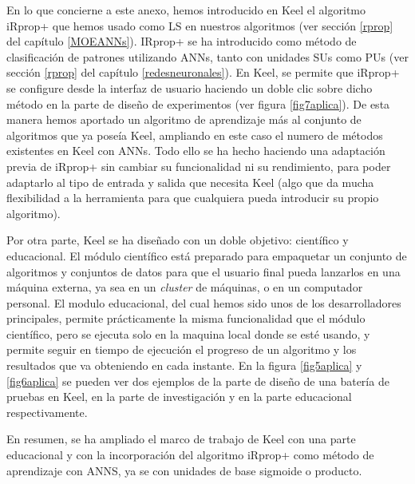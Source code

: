 En lo que concierne a este anexo, hemos introducido en Keel el algoritmo iRprop+ que
 hemos usado como LS en nuestros algoritmos (ver sección
 \ref{rprop} del capítulo \ref{MOEANNs}). IRprop+ se ha introducido como método de clasificación de
 patrones utilizando ANNs, tanto con unidades SUs como PUs (ver sección
\ref{rprop} del  capítulo \ref{redesneuronales}). En Keel, se permite que iRprop+ se configure desde
la interfaz de
 usuario haciendo un doble clic sobre dicho método en la parte de diseño de experimentos (ver figura
 \ref{fig7aplica}). De esta manera hemos aportado un algoritmo de aprendizaje más al conjunto de
 algoritmos que ya poseía Keel, ampliando en este caso el numero de métodos existentes en Keel con
 ANNs. Todo ello se ha hecho haciendo una adaptación previa de iRprop+ sin cambiar su funcionalidad
 ni su rendimiento, para poder adaptarlo al tipo de entrada y salida que necesita Keel (algo que da
 mucha flexibilidad a la herramienta para que cualquiera pueda introducir su propio algoritmo).

Por otra parte, Keel se ha diseñado con un doble objetivo: científico y educacional. El
módulo científico está preparado para empaquetar un conjunto de algoritmos y conjuntos de datos
para que el usuario final pueda lanzarlos en una máquina externa, ya sea en un \textit{cluster} de
máquinas, o en un computador personal. El modulo educacional, del cual hemos sido unos de los
desarrolladores principales, permite prácticamente la misma funcionalidad que el módulo científico,
pero se ejecuta solo en la maquina local donde se esté usando, y permite seguir en tiempo de
ejecución el progreso de un algoritmo y los resultados que va obteniendo en cada instante. En la
figura \ref{fig5aplica} y \ref{fig6aplica} se pueden ver dos ejemplos de la parte de diseño de una
batería de pruebas en Keel, en la parte de investigación y en la parte educacional respectivamente.

En resumen, se ha ampliado el marco de trabajo de Keel con una parte educacional y con la
incorporación del algoritmo iRprop+ como método de aprendizaje con ANNS, ya se con
unidades de base
sigmoide o producto.


